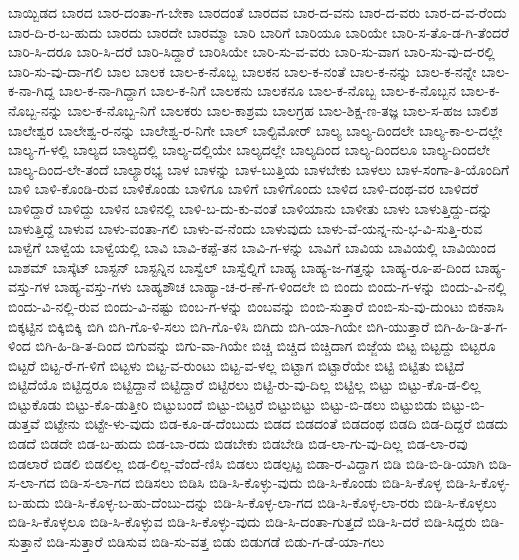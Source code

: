 {ಬಾಯ್ಬಿಡದ
ಬಾರದ
ಬಾರ-ದಂತಾ-ಗ-ಬೇಕಾ
ಬಾರದಂತೆ
ಬಾರದವ
ಬಾರ-ದ-ವನು
ಬಾರ-ದ-ವರು
ಬಾರ-ದ-ವ-ರೆಂದು
ಬಾರ-ದಿ-ರ-ಬ-ಹುದು
ಬಾರದು
ಬಾರದೇ
ಬಾರಮ್ಮಾ
ಬಾರಿ
ಬಾರಿಗೆ
ಬಾರಿಯೂ
ಬಾರಿಯೇ
ಬಾರಿ-ಸ-ತೊ-ಡ-ಗಿ-ತೆಂದರೆ
ಬಾರಿ-ಸಿ-ದರೂ
ಬಾರಿ-ಸಿ-ದರೆ
ಬಾರಿ-ಸಿದ್ದಾರೆ
ಬಾರಿಸಿಯೇ
ಬಾರಿ-ಸು-ವ-ವರು
ಬಾರಿ-ಸು-ವಾಗ
ಬಾರಿ-ಸು-ವು-ದ-ರಲ್ಲಿ
ಬಾರಿ-ಸು-ವು-ದಾ-ಗಲಿ
ಬಾಲ
ಬಾಲಕ
ಬಾಲ-ಕ-ನೊಬ್ಬ
ಬಾಲಕನ
ಬಾಲ-ಕ-ನಂತೆ
ಬಾಲ-ಕ-ನನ್ನು
ಬಾಲ-ಕ-ನನ್ನೇ
ಬಾಲ-ಕ-ನಾ-ಗಿದ್ದ
ಬಾಲ-ಕ-ನಾ-ಗಿದ್ದಾಗ
ಬಾಲ-ಕ-ನಿಗೆ
ಬಾಲಕನು
ಬಾಲಕನೂ
ಬಾಲ-ಕ-ನೊಬ್ಬ
ಬಾಲ-ಕ-ನೊಬ್ಬನ
ಬಾಲ-ಕ-ನೊಬ್ಬ-ನನ್ನು
ಬಾಲ-ಕ-ನೊಬ್ಬ-ನಿಗೆ
ಬಾಲಕರು
ಬಾಲ-ಕಾಶ್ರಮ
ಬಾಲಗ್ರಹ
ಬಾಲ-ಶಿಕ್ಷ-ಣ-ತಜ್ಞ
ಬಾಲ-ಸ-ಹಜ
ಬಾಲಿಶ
ಬಾಲೇಶ್ವರ
ಬಾಲೇಶ್ವ-ರ-ನನ್ನು
ಬಾಲೇಶ್ವ-ರ-ನಿಗೇ
ಬಾಲ್
ಬಾಲ್ಟಿಮೋರ್
ಬಾಲ್ಯ
ಬಾಲ್ಯ-ದಿಂದಲೇ
ಬಾಲ್ಯ-ಕಾ-ಲ-ದಲ್ಲೇ
ಬಾಲ್ಯ-ಗ-ಳಲ್ಲಿ
ಬಾಲ್ಯದ
ಬಾಲ್ಯದಲ್ಲಿ
ಬಾಲ್ಯ-ದಲ್ಲಿಯೇ
ಬಾಲ್ಯದಲ್ಲೇ
ಬಾಲ್ಯದಿಂದ
ಬಾಲ್ಯ-ದಿಂದಲೂ
ಬಾಲ್ಯ-ದಿಂದಲೇ
ಬಾಲ್ಯ-ದಿಂದ-ಲೇ-ತಂದೆ
ಬಾಲ್ಯಾರಭ್ಯ
ಬಾಳ
ಬಾಳನ್ನು
ಬಾಳ-ಬುತ್ತಿಯ
ಬಾಳಬೇಕು
ಬಾಳಲು
ಬಾಳ-ಸಂಗಾ-ತಿ-ಯೊಂದಿಗೆ
ಬಾಳಿ
ಬಾಳಿ-ಕೊಂಡಿ-ರುವ
ಬಾಳಿಕೊಂಡು
ಬಾಳಿಗೂ
ಬಾಳಿಗೆ
ಬಾಳಿಗೊಂದು
ಬಾಳಿದ
ಬಾಳಿ-ದಂಥ-ವರ
ಬಾಳಿದರೆ
ಬಾಳಿದ್ದಾರೆ
ಬಾಳಿದ್ದು
ಬಾಳಿನ
ಬಾಳಿನಲ್ಲಿ
ಬಾಳಿ-ಬ-ದು-ಕು-ವಂತೆ
ಬಾಳಿಯಾನು
ಬಾಳೀತು
ಬಾಳು
ಬಾಳುತ್ತಿದ್ದು-ದನ್ನು
ಬಾಳುತ್ತಿದ್ದೆ
ಬಾಳುವ
ಬಾಳು-ವಂತಾ-ಗಲಿ
ಬಾಳು-ವ-ನೆಂದು
ಬಾಳುವುದು
ಬಾಳು-ವೆ-ಯನ್ನ-ನು-ಭ-ವಿ-ಸುತ್ತಿ-ರುವ
ಬಾಳ್ವೆಗೆ
ಬಾಳ್ವೆಯ
ಬಾಳ್ವೆಯಲ್ಲಿ
ಬಾವಿ
ಬಾವಿ-ಕಪ್ಪೆ-ತನ
ಬಾವಿ-ಗ-ಳನ್ನು
ಬಾವಿಗೆ
ಬಾವಿಯ
ಬಾವಿಯಲ್ಲಿ
ಬಾವಿಯಿಂದ
ಬಾಶಮ್
ಬಾಸ್ಕೆಟ್
ಬಾಸ್ಟನ್
ಬಾಸ್ಟನ್ನಿನ
ಬಾಸ್ವೆಲ್
ಬಾಸ್ವೆಲ್ನಿಗೆ
ಬಾಹ್ಯ
ಬಾಹ್ಯ-ಜ-ಗತ್ತನ್ನು
ಬಾಹ್ಯ-ರೂ-ಪ-ದಿಂದ
ಬಾಹ್ಯ-ವಸ್ತು-ಗಳ
ಬಾಹ್ಯ-ವಸ್ತು-ಗಳು
ಬಾಹ್ಯಶೌಚ
ಬಾಹ್ಯಾ-ಚ-ರ-ಣೆ-ಗ-ಳಿಂದಲೇ
ಬಿ
ಬಿಂದು
ಬಿಂದು-ಗ-ಳನ್ನು
ಬಿಂದು-ವಿ-ನಲ್ಲಿ
ಬಿಂದು-ವಿ-ನಲ್ಲಿ-ರುವ
ಬಿಂದು-ವಿ-ನಷ್ಟು
ಬಿಂಬ-ಗ-ಳನ್ನು
ಬಿಂಬವನ್ನು
ಬಿಂಬಿ-ಸುತ್ತಾರೆ
ಬಿಂಬಿ-ಸು-ವು-ದುಂಟು
ಬಿಕನಾಸಿ
ಬಿಕ್ಕಟ್ಟಿನ
ಬಿಕ್ಕಿಬಿಕ್ಕಿ
ಬಿಗಿ
ಬಿಗಿ-ಗೊ-ಳಿ-ಸಲು
ಬಿಗಿ-ಗೊ-ಳಿಸಿ
ಬಿಗಿದು
ಬಿಗಿ-ಯಾ-ಗಿಯೇ
ಬಿಗಿ-ಯುತ್ತಾರೆ
ಬಿಗಿ-ಹಿ-ಡಿ-ತ-ಗ-ಳಿಂದ
ಬಿಗಿ-ಹಿ-ಡಿ-ತ-ದಿಂದ
ಬಿಗುವನ್ನು
ಬಿಗು-ವಾ-ಗಿಯೇ
ಬಿಚ್ಚಿ
ಬಿಚ್ಚಿದ
ಬಿಚ್ಚಿದಾಗ
ಬಿಜ್ಜೆಯ
ಬಿಟ್ಟ
ಬಿಟ್ಟದ್ದು
ಬಿಟ್ಟರೂ
ಬಿಟ್ಟರೆ
ಬಿಟ್ಟ-ರೆ-ಗ-ಳಿಗೆ
ಬಿಟ್ಟಳು
ಬಿಟ್ಟ-ವ-ರುಂಟು
ಬಿಟ್ಟ-ವ-ಳಲ್ಲ
ಬಿಟ್ಟಾಗ
ಬಿಟ್ಟಾರೆಯೇ
ಬಿಟ್ಟಿ
ಬಿಟ್ಟಿತು
ಬಿಟ್ಟಿದೆ
ಬಿಟ್ಟಿದೆಯೊ
ಬಿಟ್ಟಿದ್ದರೂ
ಬಿಟ್ಟಿದ್ದಾನೆ
ಬಿಟ್ಟಿದ್ದಾರೆ
ಬಿಟ್ಟಿರಲು
ಬಿಟ್ಟಿ-ರು-ವು-ದಿಲ್ಲ
ಬಿಟ್ಟಿಲ್ಲ
ಬಿಟ್ಟು
ಬಿಟ್ಟು-ಕೊ-ಡ-ಲಿಲ್ಲ
ಬಿಟ್ಟುಕೊಡು
ಬಿಟ್ಟು-ಕೊ-ಡುತ್ತೀರಿ
ಬಿಟ್ಟುಬಂದೆ
ಬಿಟ್ಟು-ಬಿಟ್ಟರೆ
ಬಿಟ್ಟುಬಿಟ್ಟು
ಬಿಟ್ಟು-ಬಿ-ಡಲು
ಬಿಟ್ಟುಬಿಡು
ಬಿಟ್ಟು-ಬಿ-ಡುತ್ತವೆ
ಬಿಟ್ಟೇನು
ಬಿಟ್ಟೇ-ಳು-ವುದು
ಬಿಡ-ಕೂ-ಡ-ದೆಂಬುದು
ಬಿಡದ
ಬಿಡದಂತೆ
ಬಿಡದಂಥ
ಬಿಡದಿ
ಬಿಡ-ದಿದ್ದರೆ
ಬಿಡದು
ಬಿಡದೆ
ಬಿಡದೇ
ಬಿಡ-ಬ-ಹುದು
ಬಿಡ-ಬಾ-ರದು
ಬಿಡಬೇಕು
ಬಿಡಬೇಡಿ
ಬಿಡ-ಲಾ-ಗು-ವು-ದಿಲ್ಲ
ಬಿಡ-ಲಾ-ರವು
ಬಿಡಲಾರೆ
ಬಿಡಲಿ
ಬಿಡಲಿಲ್ಲ
ಬಿಡ-ಲಿಲ್ಲ-ವೆಂದೆ-ಣಿಸಿ
ಬಿಡಲು
ಬಿಡಲ್ಪಟ್ಟ
ಬಿಡಾ-ರ-ವಿದ್ದಾಗ
ಬಿಡಿ
ಬಿಡಿ-ಬಿ-ಡಿ-ಯಾಗಿ
ಬಿಡಿ-ಸ-ಲಾ-ಗದ
ಬಿಡಿ-ಸ-ಲಾ-ಗದ
ಬಿಡಿಸಲು
ಬಿಡಿಸಿ
ಬಿಡಿ-ಸಿ-ಕೊಳ್ಳು-ವುದು
ಬಿಡಿ-ಸಿ-ಕೊಂಡು
ಬಿಡಿ-ಸಿ-ಕೊಳ್ಳ
ಬಿಡಿ-ಸಿ-ಕೊಳ್ಳ-ಬ-ಹುದು
ಬಿಡಿ-ಸಿ-ಕೊಳ್ಳ-ಬ-ಹು-ದೆಂಬು-ದನ್ನು
ಬಿಡಿ-ಸಿ-ಕೊಳ್ಳ-ಲಾ-ಗದ
ಬಿಡಿ-ಸಿ-ಕೊಳ್ಳ-ಲಾ-ರರು
ಬಿಡಿ-ಸಿ-ಕೊಳ್ಳಲು
ಬಿಡಿ-ಸಿ-ಕೊಳ್ಳಲೂ
ಬಿಡಿ-ಸಿ-ಕೊಳ್ಳುವ
ಬಿಡಿ-ಸಿ-ಕೊಳ್ಳು-ವುದು
ಬಿಡಿ-ಸಿ-ದಂತಾ-ಗುತ್ತದೆ
ಬಿಡಿ-ಸಿ-ದರೆ
ಬಿಡಿ-ಸಿದ್ದರು
ಬಿಡಿ-ಸುತ್ತಾನೆ
ಬಿಡಿ-ಸುತ್ತಾರೆ
ಬಿಡಿಸುವ
ಬಿಡಿ-ಸು-ವತ್ತ
ಬಿಡು
ಬಿಡುಗಡೆ
ಬಿಡು-ಗ-ಡೆ-ಯಾ-ಗಲು
}
